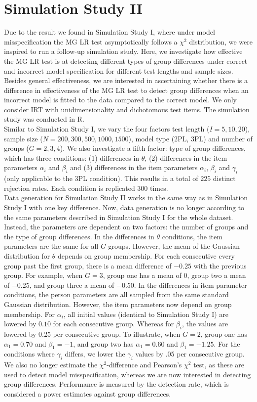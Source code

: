 \documentclass[Royal,sageapa,times,doublespace]{sagej}
\begin{document}
\section{Simulation Study II}
Due to the result we found in Simulation Study I, where under model misspecification the MG LR test asymptotically follows a $\chi^2$ distribution, we were inspired to run a follow-up simulation study. Here, we investigate how effective the MG LR test is at detecting different types of group differences under correct and incorrect model specification for different test lengths and sample sizes. Besides general effectiveness, we are interested in ascertaining whether there is a difference in effectiveness of the MG LR test to detect group differences when an incorrect model is fitted to the data compared to the correct model. We only consider IRT with unidimensionality and dichotomous test items. The simulation study was conducted in R. \\
\indent Similar to Simulation Study I, we vary the four factors test length ($I = 5, 10, 20$), sample size ($N = 200, 300, 500, 1000, 1500$), model type (2PL, 3PL) and number of groups ($G = 2, 3, 4$). We also investigate a fifth factor: type of group differences, which has three conditions: (1) differences in $\theta$, (2) differences in the item parameters $\alpha_i$ and $\beta_i$ and (3) differences in the item parameters $\alpha_i$, $\beta_i$ and $\gamma_i$ (only applicable to the 3PL condition). This results in a total of $225$ distinct rejection rates. Each condition is replicated $300$ times. \\
\indent Data generation for Simulation Study II works in the same way as in Simulation Study I with one key difference. Now, data generation is no longer according to the same parameters described in Simulation Study I for the whole dataset. Instead, the parameters are dependent on two factors: the number of groups and the type of group differences. In the differences in $\theta$ conditions, the item parameters are the same for all $G$ groups. However, the mean of the Gaussian distribution for $\theta$ depends on group membership. For each consecutive every group past the first group, there is a mean difference of $-0.25$ with the previous group. For example, when $G = 3$, group one has a mean of 0, group two a mean of $-0.25$, and group three a mean of $-0.50$. In the differences in item parameter conditions, the person parameters are all sampled from the same standard Gaussian distribution. However, the item parameters now depend on group membership. For $\alpha_i$, all initial values (identical to Simulation Study I) are lowered by $0.10$ for each consecutive group. Whereas for $\beta_i$, the values are lowered by $0.25$ per consecutive group. To illustrate, when $G = 2$, group one has $\alpha_1 = 0.70$ and $\beta_1 = -1$, and group two has $\alpha_1 = 0.60$ and $\beta_1 = -1.25$. For the conditions where $\gamma_i$ differs, we lower the $\gamma_i$ values by .05 per consecutive group. We also no longer estimate the $\chi^2$-difference and Pearson's $\chi^2$ test, as these are used to detect model misspecification, whereas we are now interested in detecting group differences. Performance is measured by the detection rate, which is considered a power estimates against group differences.
\end{document}
